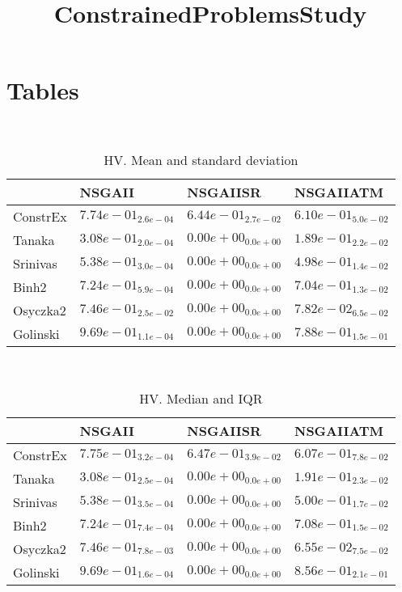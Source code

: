 \documentclass{article}
\title{ConstrainedProblemsStudy}
\author{}
\begin{document}
\maketitle
\section{Tables}
\
\begin{table}
\caption{HV. Mean and standard deviation}
\label{table:mean.HV}
\centering
\begin{scriptsize}
\begin{tabular}{llll}
\hline & NSGAII & NSGAIISR &  NSGAIIATM\\
\hline
ConstrEx & \cellcolor{gray95}$  7.74e-01_{ 2.6e-04}$ & \cellcolor{gray25}$  6.44e-01_{ 2.7e-02}$ & $  6.10e-01_{ 5.0e-02}$ \\
Tanaka & \cellcolor{gray95}$  3.08e-01_{ 2.0e-04}$ & $  0.00e+00_{ 0.0e+00}$ & $  1.89e-01_{ 2.2e-02}$ \\
Srinivas & \cellcolor{gray95}$  5.38e-01_{ 3.0e-04}$ & $  0.00e+00_{ 0.0e+00}$ & $  4.98e-01_{ 1.4e-02}$ \\
Binh2 & \cellcolor{gray95}$  7.24e-01_{ 5.9e-04}$ & $  0.00e+00_{ 0.0e+00}$ & $  7.04e-01_{ 1.3e-02}$ \\
Osyczka2 & \cellcolor{gray95}$  7.46e-01_{ 2.5e-02}$ & $  0.00e+00_{ 0.0e+00}$ & $  7.82e-02_{ 6.5e-02}$ \\
Golinski & \cellcolor{gray95}$  9.69e-01_{ 1.1e-04}$ & $  0.00e+00_{ 0.0e+00}$ & $  7.88e-01_{ 1.5e-01}$ \\
\hline
\end{tabular}
\end{scriptsize}
\end{table}
\
\begin{table}
\caption{HV. Median and IQR}
\label{table:median.HV}
\begin{scriptsize}
\centering
\begin{tabular}{llll}
\hline & NSGAII & NSGAIISR &  NSGAIIATM\\
\hline
ConstrEx & \cellcolor{gray95}$  7.75e-01_{ 3.2e-04}$ & \cellcolor{gray25}$  6.47e-01_{ 3.9e-02}$ & $  6.07e-01_{ 7.8e-02}$ \\
Tanaka & \cellcolor{gray95}$  3.08e-01_{ 2.5e-04}$ & $  0.00e+00_{ 0.0e+00}$ & $  1.91e-01_{ 2.3e-02}$ \\
Srinivas & \cellcolor{gray95}$  5.38e-01_{ 3.5e-04}$ & $  0.00e+00_{ 0.0e+00}$ & $  5.00e-01_{ 1.7e-02}$ \\
Binh2 & \cellcolor{gray95}$  7.24e-01_{ 7.4e-04}$ & $  0.00e+00_{ 0.0e+00}$ & $  7.08e-01_{ 1.5e-02}$ \\
Osyczka2 & \cellcolor{gray95}$  7.46e-01_{ 7.8e-03}$ & $  0.00e+00_{ 0.0e+00}$ & $  6.55e-02_{ 7.5e-02}$ \\
Golinski & \cellcolor{gray95}$  9.69e-01_{ 1.6e-04}$ & $  0.00e+00_{ 0.0e+00}$ & $  8.56e-01_{ 2.1e-01}$ \\
\hline
\end{tabular}
\end{scriptsize}
\end{table}
\end{document}
